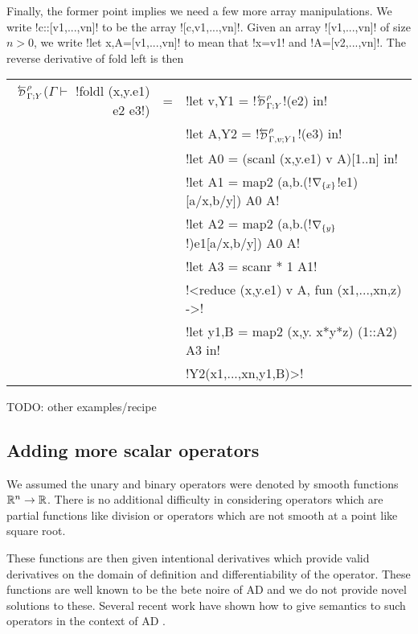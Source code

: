 Finally, the former point implies we need a few more array manipulations. 
We write !c::[v1,...,vn]! to be the array ![c,v1,...,vn]!. 
Given an array ![v1,...,vn]! of size $n>0$, we write !let x,A=[v1,...,vn]! to mean 
that !x=v1! and !A=[v2,...,vn]!. The reverse derivative of fold left is then
\begin{center}
\begin{tabular}{r c l}
    $\directD{\rho}{\Gamma}{Y}$($\Gamma\vdash $ !foldl (x,y.e1) e2 e3!) &=&
            !let v,Y1 = !$\directD{\rho}{\Gamma}{Y}$!(e2) in! \\
            && !let A,Y2 = !$\directD{\rho}{\Gamma,v}{Y1}$!(e3) in! \\
            && !let A0 = (scanl (x,y.e1) v A)[1..n] in! \\
            && !let A1 = map2 (a,b.(!$\nabla_{\{x\}}$!e1)[a/x,b/y]) A0 A! \\
            && !let A2 = map2 (a,b.(!$\nabla_{\{y\}}$!)e1[a/x,b/y]) A0 A! \\
            && !let A3 = scanr * 1 A1! \\
            && !<reduce (x,y.e1) v A, fun (x1,...,xn,z) ->! \\
            && !let y1,B = map2 (x,y. x*y*z) (1::A2) A3 in! \\
            && !Y2(x1,...,xn,y1,B)>! \\
\end{tabular}
\end{center}

TODO: other examples/recipe

\subsection{Adding more scalar operators} %
\label{sub:Adding more scalar operators}

We assumed the unary and binary operators were denoted by smooth functions $\mathbb{R}^n\to\mathbb{R}$. 
There is no additional difficulty in considering operators which are partial functions 
like division or operators which are not smooth at a point like square root.

These functions are then given intentional derivatives which provide valid derivatives 
on the domain of definition and differentiability of the operator. 
These functions are well known to be the bete noire of AD \cite{griewank2008evaluating} 
and we do not provide novel solutions to these.  
Several recent work have shown how to give semantics to such operators in the context of AD \cite{vakar2020denotational,mazza2021automatic,sherman2021,lee2020correctness}.

